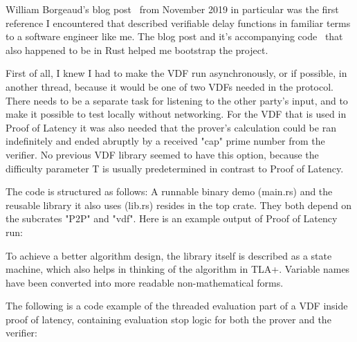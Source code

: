 William Borgeaud's blog post~\cite{Borgeaud2019-wk} from November 2019 in particular was the first reference I encountered that described verifiable delay functions in familiar terms to a software engineer like me. The blog post and it's accompanying code~\cite{Borgeaud2019-wk} that also happened to be in Rust helped me bootstrap the project.

First of all, I knew I had to make the VDF run asynchronously, or if possible, in another thread, because it would be one of two VDFs needed in the protocol. There needs to be a separate task for listening to the other party's input, and to make it possible to test locally without networking. For the VDF that is used in Proof of Latency it was also needed that the prover's calculation could be ran indefinitely and ended abruptly by a received "cap" prime number from the verifier. No previous VDF library seemed to have this option, because the difficulty parameter T is usually predetermined in contrast to Proof of Latency.

The code is structured as follows: A runnable binary demo (main.rs) and the reusable library it also uses (lib.rs) resides in the top crate. They both depend on the subcrates "P2P" and "vdf". Here is an example output of Proof of Latency run:

To achieve a better algorithm design, the library itself is described as a state machine, which also helps in thinking of the algorithm in TLA+. Variable names have been converted into more readable non-mathematical forms.

The following is a code example of the threaded evaluation part of a VDF inside proof of latency, containing evaluation stop logic for both the prover and the verifier:


